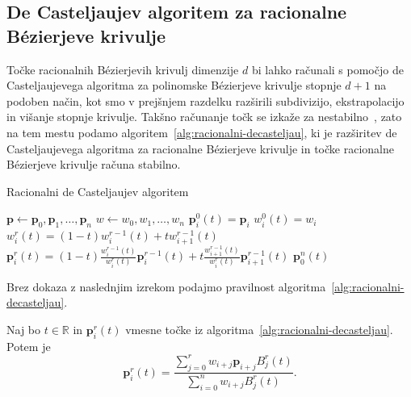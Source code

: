 \documentclass[isrm2, tisk]{fmfdelo}
\newcommand{\R}{\mathbb R}
\newcommand{\p}{\mathbf{p}}
\begin{document}

    \subsection{De Casteljaujev algoritem za racionalne Bézierjeve krivulje}
    Točke racionalnih Bézierjevih krivulj dimenzije $d$ bi lahko računali s pomočjo de Casteljaujevega algoritma za polinomske Bézierjeve krivulje stopnje $d+1$ na podoben način, kot smo v prejšnjem razdelku razširili subdivizijo, ekstrapolacijo in višanje stopnje krivulje.
    Takšno računanje točk se izkaže za nestabilno~\cite{stability-rational}, zato na tem mestu podamo algoritem~\ref{alg:racionalni-decasteljau}, ki je razširitev de Casteljaujevega algoritma za racionalne Bézierjeve krivulje in točke racionalne Bézierjeve krivulje računa stabilno.
    \begin{algorithm}[h!]
        \caption{Racionalni de Casteljaujev algoritem}
        \begin{algorithmic}
            \State $\p \gets \p_0,\p_1,\dots,\p_n$
            \State $w\gets w_0,w_1,\dots,w_n$
                \State $\p_i^0(t)=\p_i$
                \State $w_i^0(t)=w_i$
            \EndFor
                    \State $w_i^r(t)=(1-t)w_{i}^{r-1}(t)+tw_{i+1}^{r-1}(t)$
                    \State $\p_i^r(t)=(1-t)\frac{w_{i}^{r-1}(t)}{w_{i}^{r}(t)}\p_i^{r-1}(t)+t\frac{w_{i+1}^{r-1}(t)}{w_{i}^{r}(t)}\p_{i+1}^{r-1}(t)$
                \EndFor
            \EndFor
            \State \Return $\p_0^n(t)$
        \end{algorithmic}\label{alg:racionalni-decasteljau}
    \end{algorithm}
    \noindent Brez dokaza z naslednjim izrekom podajmo pravilnost algoritma~\ref{alg:racionalni-decasteljau}.
    \begin{izrek}
        Naj bo $t\in\R$ in $\p_i^r(t)$ vmesne točke iz algoritma~\ref{alg:racionalni-decasteljau}.
        Potem je
        \[\p_i^r(t)= \frac{\sum^{r}_{j=0}w_{i+j}\p_{i+j} B^r_j(t)}{\sum^{n}_{i=0}w_{i+j} B^r_j(t)}. \]
    \end{izrek}
\end{document}
